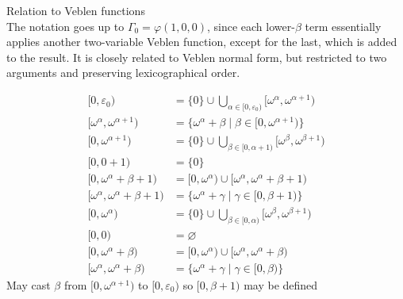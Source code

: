 \documentclass{article}
\begin{document}
Relation to Veblen functions \\
The notation goes up to $\Gamma_0=\varphi(1, 0, 0)$,
since each lower-$\beta$ term essentially applies
another two-variable Veblen function,
except for the last, which is added to the result.
It is closely related to Veblen normal form,
but restricted to two arguments
and preserving lexicographical order.

\newpage

\begin{align*}
  [0, \varepsilon_0) &= \{0\} \cup \bigcup_{\alpha \in [0, \varepsilon_0)}[\omega^\alpha, \omega^{\alpha+1}) \\
  [\omega^\alpha, \omega^{\alpha+1}) &= \{\omega^\alpha+\beta \mid \beta \in [0, \omega^{\alpha+1})\} \\
  [0, \omega^{\alpha+1}) &= \{0\} \cup \bigcup_{\beta \in [0, \alpha+1)}[\omega^\beta, \omega^{\beta+1}) \\
  [0, 0+1) &= \{0\} \\
  [0, \omega^\alpha+\beta+1) &= [0, \omega^\alpha) \cup [\omega^\alpha, \omega^\alpha+\beta+1) \\
  [\omega^\alpha, \omega^\alpha+\beta+1) &= \{\omega^\alpha+\gamma \mid \gamma \in [0, \beta+1)\} \\
  [0, \omega^\alpha) &= \{0\} \cup \bigcup_{\beta \in [0, \alpha)}[\omega^\beta, \omega^{\beta+1}) \\
  [0, 0) &= \varnothing \\
  [0, \omega^\alpha+\beta) &= [0, \omega^\alpha) \cup [\omega^\alpha, \omega^\alpha+\beta) \\
  [\omega^\alpha, \omega^\alpha+\beta) &= \{\omega^\alpha+\gamma \mid \gamma \in [0, \beta)\}
\end{align*}
May cast $\beta$ from $[0, \omega^{\alpha+1})$ to $[0, \varepsilon_0)$
so $[0, \beta+1)$ may be defined
\end{document}
